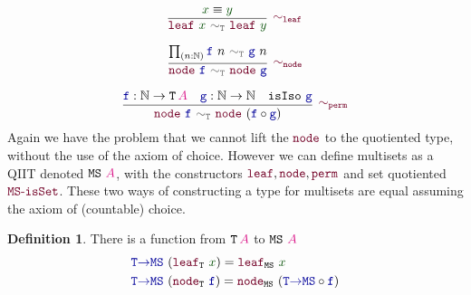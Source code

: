 \documentclass[twoside,11pt,openright]{report}
\theoremstyle{plain} %
\theoremstyle{definition}
\newtheorem{defn}[thm]{Definition}%
\theoremstyle{remark}
\newcommand*{\term}[1]{\textcolor{green!30!black}{#1}} %
\newcommand*{\type}[1]{\textcolor{magenta!90!black}{#1}}
\newcommand*{\relation}[1]{\textcolor{gray!75!black}{\ensuremath{\mathtt{#1}}}}
\newcommand*{\function}[1]{\textcolor{blue!60!black}{\ensuremath{\mathtt{#1}}}}
\newcommand*{\constructor}[1]{\textcolor{purple!60!black}{\ensuremath{\mathtt{#1}}}}
\newcommand*{\typeformer}[1]{\ensuremath{\mathtt{#1}}}
\begin{document}
\begin{center}
  \strut
  \hfill
  \begin{minipage}{0.35\linewidth}
    \begin{equation}
      \vcenter{\infer[\constructor{\sim_{leaf}}]{\constructor{leaf}~\term{x}~\relation{\sim_{T}}~\constructor{leaf}~\term{y}}{\term{x} \equiv \term{y}}}
    \end{equation}
  \end{minipage}
  \hfill
  \begin{minipage}{0.35\linewidth}
    \begin{equation}
      \vcenter{\infer[\constructor{\sim_{node}}]{\constructor{node}~\function{f}~\relation{\sim_T}~\constructor{node}~\function{g}}{\prod_{(n : \mathbb{N})} \function{f}~n~\relation{\sim_T}~\function{g}~n}}
    \end{equation}
  \end{minipage}
  \hfill
  \strut
\end{center}
\begin{equation}
  \vcenter{\infer[\constructor{\sim_{perm}}]{\constructor{node}~\function{f}~\relation{\sim_T}~\constructor{node}~(\function{f} \circ \function{g})}{\function{f} : \mathbb{N} \rightarrow \typeformer{T}\,\type{A} & \function{g} : \mathbb{N} \rightarrow \mathbb{N} & \mathtt{isIso}~\function{g}}}
\end{equation}
Again we have the problem that we cannot lift the \(\constructor{node}\) to the quotiented type, without the use of the axiom of choice. However we can define multisets as a QIIT denoted \(\typeformer{MS}~\type{A}\), with the constructors \(\constructor{leaf}, \constructor{node},\constructor{perm}\) and set quotiented \(\constructor{MS\text{-}isSet}\). These two ways of constructing a type for multisets are equal assuming the axiom of (countable) choice.
\begin{defn}
  There is a function from \(\typeformer{T}\,\type{A}\) to \(\typeformer{MS}~\type{A}\)
  \begin{equation}
    \begin{aligned}
      &\function{T{\rightarrow}MS}~(\constructor{leaf}_{\typeformer{T}}~\term{x}) = \constructor{leaf}_{\typeformer{MS}}~\term{x} \\
      &\function{T{\rightarrow}MS}~(\constructor{node}_{\typeformer{T}}~\function{f}) = \constructor{node}_{\typeformer{MS}}~(\function{T{\rightarrow}MS} \circ \function{f})
    \end{aligned}
  \end{equation}
\end{defn}
\end{document}
